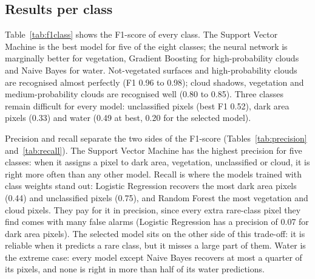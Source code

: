 \documentclass[11pt,a4paper]{article}
\begin{document}
\subsection{Results per class}

Table~\ref{tab:f1class} shows the F1-score of every class. The Support Vector
Machine is the best model for five of the eight classes; the neural network is
marginally better for vegetation, Gradient Boosting for high-probability
clouds and Naive Bayes for water. Not-vegetated surfaces and high-probability clouds are recognised
almost perfectly (F1 0.96 to 0.98); cloud shadows, vegetation and
medium-probability clouds are recognised well (0.80 to 0.85). Three classes
remain difficult for every model: unclassified pixels (best F1 0.52), dark
area pixels (0.33) and water (0.49 at best, 0.20 for the selected model).

\begin{table}[H]
\centering\small
\caption{F1-score per class on the test set. The best value of each class is
in bold.}
\label{tab:f1class}

\end{table}

Precision and recall separate the two sides of the F1-score
(Tables~\ref{tab:precision} and~\ref{tab:recall}). The Support Vector Machine
has the highest precision for five classes: when it assigns a pixel to dark
area, vegetation, unclassified or cloud, it is right more often than any other
model. Recall is where the models trained with class weights stand out:
Logistic Regression recovers the most dark area pixels (0.44) and unclassified
pixels (0.75), and Random Forest the most vegetation and cloud pixels. They
pay for it in precision, since every extra rare-class pixel they find comes
with many false alarms (Logistic Regression has a precision of 0.07 for dark
area pixels). The selected model sits on the other side of this trade-off: it
is reliable when it predicts a rare class, but it misses a large part of them.
Water is the extreme case: every model except Naive Bayes recovers at most a
quarter of its pixels, and none is right in more than half of its water
predictions.

\begin{table}[H]
\centering\small
\caption{Precision per class on the test set (of the pixels predicted as a
class, the share that belongs to it). The best value of each class is in
bold.}
\label{tab:precision}

\end{table}
\end{document}
